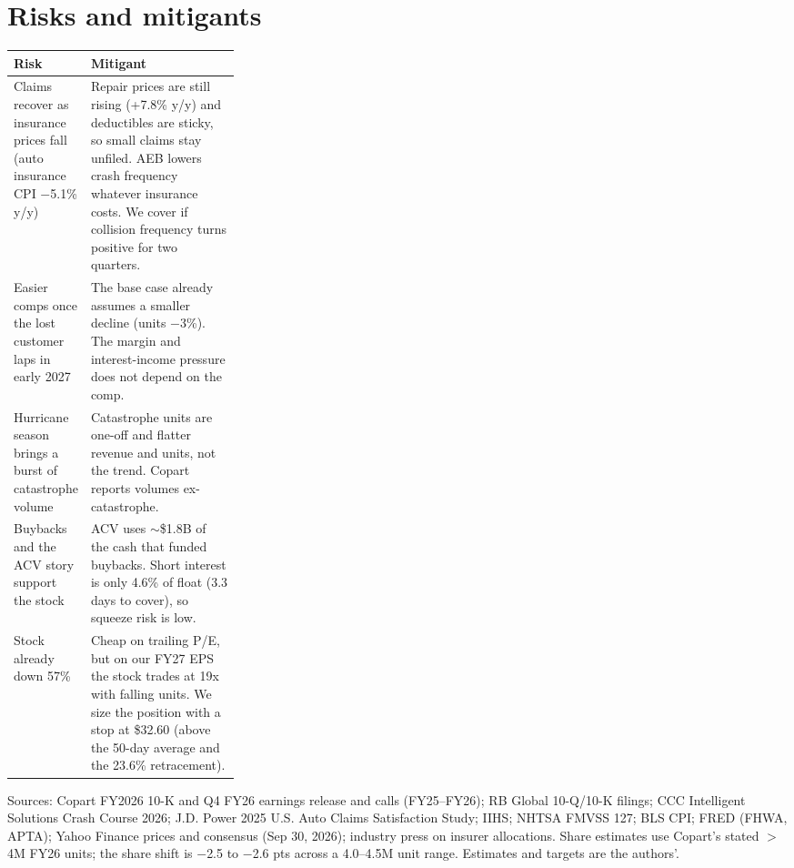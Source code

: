 \documentclass[10pt]{article}
\begin{document}
\section{Risks and mitigants}
{\footnotesize
\begin{tabularx}{\linewidth}{@{}p{0.29\linewidth}X@{}}
\toprule
Risk & Mitigant \\
\midrule
Claims recover as insurance prices fall (auto insurance CPI $-$5.1\% y/y) & Repair prices are still rising (+7.8\% y/y) and deductibles are sticky, so small claims stay unfiled. AEB lowers crash frequency whatever insurance costs. We cover if collision frequency turns positive for two quarters. \\
Easier comps once the lost customer laps in early 2027 & The base case already assumes a smaller decline (units $-$3\%). The margin and interest-income pressure does not depend on the comp. \\
Hurricane season brings a burst of catastrophe volume & Catastrophe units are one-off and flatter revenue and units, not the trend. Copart reports volumes ex-catastrophe. \\
Buybacks and the ACV story support the stock & ACV uses $\sim$\$1.8B of the cash that funded buybacks. Short interest is only 4.6\% of float (3.3 days to cover), so squeeze risk is low. \\
Stock already down 57\% & Cheap on trailing P/E, but on our FY27 EPS the stock trades at 19x with falling units. We size the position with a stop at \$32.60 (above the 50-day average and the 23.6\% retracement). \\
\bottomrule
\end{tabularx}}

\vspace{2pt}
{\scriptsize\color{gray} Sources: Copart FY2026 10-K and Q4 FY26 earnings release and calls (FY25--FY26); RB Global 10-Q/10-K filings; CCC Intelligent Solutions Crash Course 2026; J.D. Power 2025 U.S. Auto Claims Satisfaction Study; IIHS; NHTSA FMVSS 127; BLS CPI; FRED (FHWA, APTA); Yahoo Finance prices and consensus (Sep 30, 2026); industry press on insurer allocations. Share estimates use Copart's stated $>$4M FY26 units; the share shift is $-$2.5 to $-$2.6 pts across a 4.0--4.5M unit range. Estimates and targets are the authors'.\par}
\end{document}
